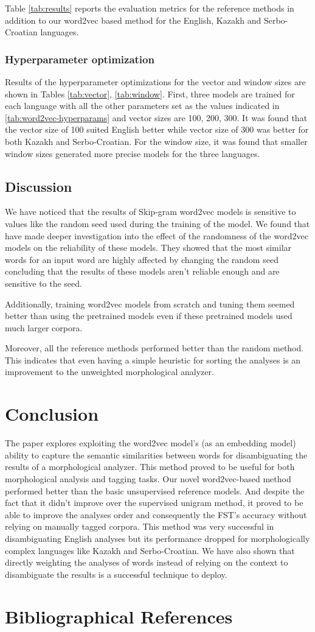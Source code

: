 \documentclass[free]{flammie}
\begin{document}
Table \ref{tab:results} reports the evaluation metrics for the reference methods
in addition to our word2vec based method for the English, Kazakh and
Serbo-Croatian languages.

\subsubsection{Hyperparameter optimization}
Results of the hyperparameter optimizations for the vector and window sizes are
shown in Tables \ref{tab:vector}, \ref{tab:window}. First, three models are
trained for each language with all the other parameters set as the values
indicated in \ref{tab:word2vec-hyperparams} and vector sizes are 100, 200, 300.
It was found that the vector size of 100 suited English better while vector size
of 300 was better for both Kazakh and Serbo-Croatian. For the window size, it
was found that smaller window sizes generated more precise models for the three
languages.

\subsection{Discussion}
We have noticed that the results of Skip-gram word2vec models is sensitive to
values like the random seed used during the training of the model. We found that
\cite{Hellrich2017Dont} have made deeper investigation into the effect of the
randomness of the word2vec models on the reliability of these models. They
showed that the most similar words for an input word are highly affected by
changing the random seed concluding that the results of these models aren't
reliable enough and are sensitive to the seed.

Additionally, training word2vec models from scratch and tuning them seemed
better than using the pretrained models even if these pretrained models used
much larger corpora.

Moreover, all the reference methods performed better than the random method.
This indicates that even having a simple heuristic for sorting the analyses is
an improvement to the unweighted morphological analyzer.

\section{Conclusion}
The paper explores exploiting the word2vec model's (as an embedding model)
ability to capture the semantic similarities between words for disambiguating
the results of a morphological analyzer. This method proved to be useful for
both morphological analysis and tagging tasks. Our novel word2vec-based method
performed better than the basic unsupervised reference models. And despite the
fact that it didn't improve over the supervised unigram method, it proved to be
able to improve the analyses order and consequently the FST's accuracy without
relying on manually tagged corpora. This method was very successful in
disambiguating English analyses but its performance dropped for morphologically
complex languages like Kazakh and Serbo-Croatian. We have also shown that
directly weighting the analyses of words instead of relying on the context to
disambiguate the results is a successful technique to deploy.
\section{Bibliographical References}


\end{document}
